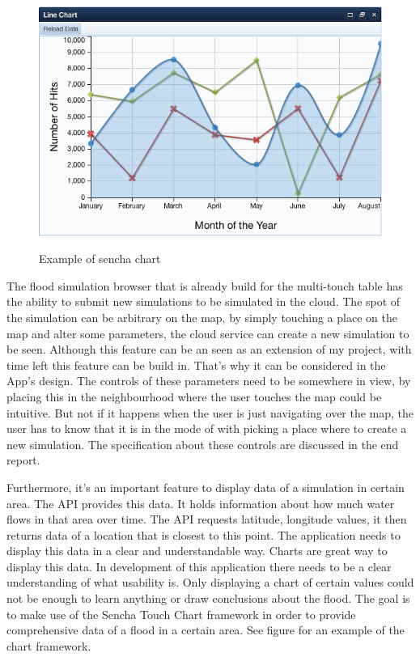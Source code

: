 \begin{figure}[ht]
	\includegraphics[scale=0.5]{chart.png} \\
\caption{Example of sencha chart}
\label{fig:sencha chart}
\end{figure}

The flood simulation browser that is already build for the multi-touch table has the ability to submit new simulations to be simulated in the cloud. The spot of the simulation can be arbitrary on the map, by simply touching a place on the map and alter some parameters, the cloud service can create a new simulation to be seen. Although this feature can be an seen as an extension of my project, with time left this feature can be build in. That's why it can be considered in the App's design. The controls of these parameters need to be somewhere in view, by placing this in the neighbourhood where the user touches the map could be intuitive. But not if it happens when the user is just navigating over the map, the user has to know that it is in the mode of with picking a place where to create a new simulation. The specification about these controls are discussed in the end report.

Furthermore, it's an important feature to display data of a simulation in certain area. The API provides this data. It holds information about how much water flows in that area over time. The API requests latitude, longitude values, it then returns data of a location that is closest to this point. The application needs to display this data in a clear and understandable way. Charts are great way to display this data. In development of this application there needs to be a clear understanding of what usability is. Only displaying a chart of certain values could not be enough to learn anything or draw conclusions about the flood. The goal is to make use of the Sencha Touch Chart framework in order to provide comprehensive data of a flood in a certain area. See figure \label{fig:sencha chart} for an example of the chart framework.



